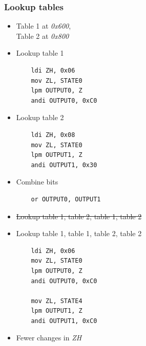 \documentclass{beamer}
\begin{document}
\begin{frame}[fragile]
\frametitle{Lookup tables}
\begin{minipage}[t]{0.48\textwidth}
\begin{itemize}[<+->]
\item Table 1 at \textit{0x600}, \\ Table 2 at \textit{0x800}
\item Lookup table 1
\begin{lstlisting}
    ldi ZH, 0x06
    mov ZL, STATE0
    lpm OUTPUT0, Z
    andi OUTPUT0, 0xC0
\end{lstlisting}
\item Lookup table 2
\begin{lstlisting}     
    ldi ZH, 0x08
    mov ZL, STATE0
    lpm OUTPUT1, Z
    andi OUTPUT1, 0x30 
\end{lstlisting}
\item Combine bits
\begin{lstlisting}
    or OUTPUT0, OUTPUT1
\end{lstlisting}
\end{itemize}
\end{minipage}
\hfill
\begin{minipage}[t]{0.48\textwidth}
\begin{itemize}[<+->]
\item \st{Lookup table 1, table 2, table 1, table 2}
\item Lookup table 1, table 1, table 2, table 2
\begin{lstlisting}
    ldi ZH, 0x06
    mov ZL, STATE0
    lpm OUTPUT0, Z
    andi OUTPUT0, 0xC0

    mov ZL, STATE4
    lpm OUTPUT1, Z
    andi OUTPUT1, 0xC0
\end{lstlisting}
\item Fewer changes in \textit{ZH}
\end{itemize}
\end{minipage}
\end{frame}
\end{document}
